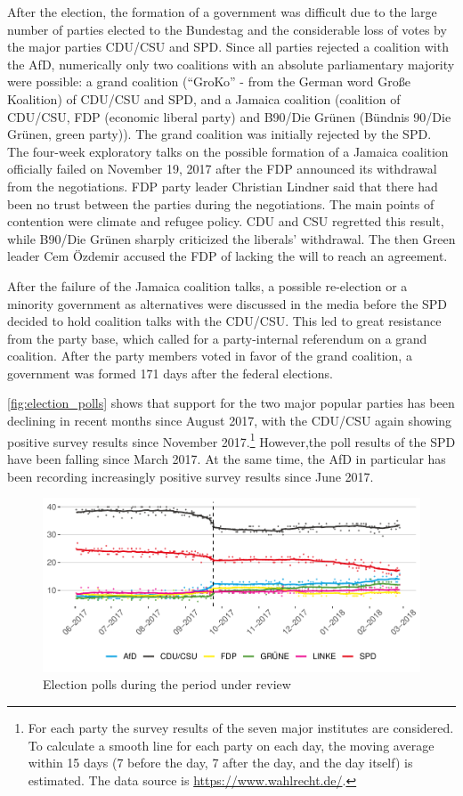 \documentclass[
]{article}
\begin{document}
After the election, the formation of a government was difficult due to
the large number of parties elected to the Bundestag and the
considerable loss of votes by the major parties CDU/CSU and SPD. Since
all parties rejected a coalition with the AfD, numerically only two
coalitions with an absolute parliamentary majority were possible: a
grand coalition (``GroKo'' - from the German word Große Koalition) of
CDU/CSU and SPD, and a Jamaica coalition (coalition of CDU/CSU, FDP
(economic liberal party) and B90/Die Grünen (Bündnis 90/Die Grünen,
green party)). The grand coalition was initially rejected by the SPD.
The four-week exploratory talks on the possible formation of a Jamaica
coalition officially failed on November 19, 2017 after the FDP announced
its withdrawal from the negotiations. FDP party leader Christian Lindner
said that there had been no trust between the parties during the
negotiations. The main points of contention were climate and refugee
policy. CDU and CSU regretted this result, while B90/Die Grünen sharply
criticized the liberals' withdrawal. The then Green leader Cem Özdemir
accused the FDP of lacking the will to reach an agreement.

After the failure of the Jamaica coalition talks, a possible re-election
or a minority government as alternatives were discussed in the media
before the SPD decided to hold coalition talks with the CDU/CSU. This
led to great resistance from the party base, which called for a
party-internal referendum on a grand coalition. After the party members
voted in favor of the grand coalition, a government was formed 171 days
after the federal elections.

\autoref{fig:election_polls} shows that support for the two major
popular parties has been declining in recent months since August 2017,
with the CDU/CSU again showing positive survey results since November
2017.\footnote{For each party the survey results of the seven major
  institutes are considered. To calculate a smooth line for each party
  on each day, the moving average within 15 days (7 before the day, 7
  after the day, and the day itself) is estimated. The data source is
  \url{https://www.wahlrecht.de/}.} However,the poll results of the SPD
have been falling since March 2017. At the same time, the AfD in
particular has been recording increasingly positive survey results since
June 2017.

\begin{figure}

{\centering \includegraphics[width=0.6\linewidth]{main_text_files/figure-latex/election polls-1} 

}

\caption{Election polls during the period under review \label{fig:election_polls}}\label{fig:election polls}
\end{figure}
\end{document}
